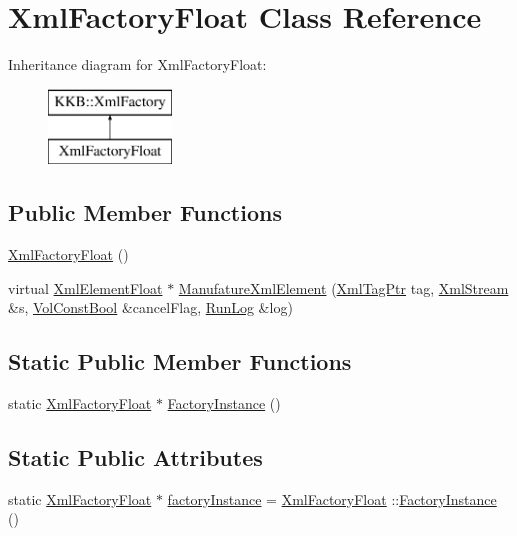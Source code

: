 \hypertarget{class_xml_factory_float}{}\section{Xml\+Factory\+Float Class Reference}
\label{class_xml_factory_float}
Inheritance diagram for Xml\+Factory\+Float\+:\begin{figure}[H]
\begin{center}
\leavevmode
\includegraphics[height=2.000000cm]{class_xml_factory_float}
\end{center}
\end{figure}
\subsection*{Public Member Functions}
\begin{DoxyCompactItemize}
\item 
\hyperlink{class_xml_factory_float_a1c1d3ca6f11cd37bb53c9bbe727df6e2}{Xml\+Factory\+Float} ()
\item 
virtual \hyperlink{class_k_k_b_1_1_xml_element_float}{Xml\+Element\+Float} $\ast$ \hyperlink{class_xml_factory_float_a39c427bc2d99b8c16c980fe8b603b7bc}{Manufature\+Xml\+Element} (\hyperlink{namespace_k_k_b_a9253a3ea8a5da18ca82be4ca2b390ef0}{Xml\+Tag\+Ptr} tag, \hyperlink{class_k_k_b_1_1_xml_stream}{Xml\+Stream} \&s, \hyperlink{namespace_k_k_b_a7d390f568e2831fb76b86b56c87bf92f}{Vol\+Const\+Bool} \&cancel\+Flag, \hyperlink{class_k_k_b_1_1_run_log}{Run\+Log} \&log)
\end{DoxyCompactItemize}
\subsection*{Static Public Member Functions}
\begin{DoxyCompactItemize}
\item 
static \hyperlink{class_xml_factory_float}{Xml\+Factory\+Float} $\ast$ \hyperlink{class_xml_factory_float_a9442a58d0cfb9a1e1e60ddb3b7df1620}{Factory\+Instance} ()
\end{DoxyCompactItemize}
\subsection*{Static Public Attributes}
\begin{DoxyCompactItemize}
\item 
static \hyperlink{class_xml_factory_float}{Xml\+Factory\+Float} $\ast$ \hyperlink{class_xml_factory_float_aa153c9bd25530403d1df72ca7722a89f}{factory\+Instance} = \hyperlink{class_xml_factory_float}{Xml\+Factory\+Float} \+::\hyperlink{class_xml_factory_float_a9442a58d0cfb9a1e1e60ddb3b7df1620}{Factory\+Instance} ()
\end{DoxyCompactItemize}


